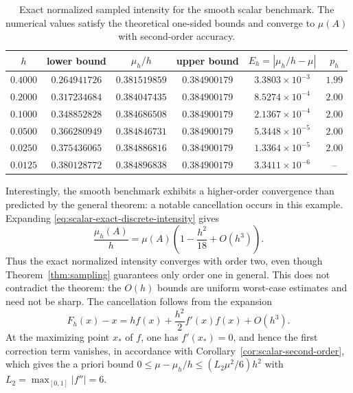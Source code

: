 \documentclass[pdflatex,sn-mathphys-num]{sn-jnl}
\numberwithin{equation}{section}
\theoremstyle{thmstyleone}%
\theoremstyle{definition}
\theoremstyle{remark}
\begin{document}
\begin{table}[t]
    \centering
    \caption{Exact normalized sampled intensity for the smooth scalar benchmark. The numerical values satisfy the theoretical one-sided bounds and converge to $\mu(A)$ with second-order accuracy.}
    \label{tab:scalar-bounds}
    \begin{tabular}{cccccc}
        \toprule
        \(h\)
        &
        lower bound
        &
        \(\mu_h/h\)
        &
        upper bound
        &
        \(E_h=|\mu_h/h-\mu|\)
        &
        \(p_h\)
        \\
        \midrule
        \(0.4000\) & \(0.264941726\) & \(0.381519859\)
                   & \(0.384900179\) & \(3.3803\times10^{-3}\) & \(1.99\)\\
        \(0.2000\) & \(0.317234684\) & \(0.384047435\)
                   & \(0.384900179\) & \(8.5274\times10^{-4}\) & \(2.00\)\\
        \(0.1000\) & \(0.348852828\) & \(0.384686508\)
                   & \(0.384900179\) & \(2.1367\times10^{-4}\) & \(2.00\)\\
        \(0.0500\) & \(0.366280949\) & \(0.384846731\)
                   & \(0.384900179\) & \(5.3448\times10^{-5}\) & \(2.00\)\\
        \(0.0250\) & \(0.375436065\) & \(0.384886816\)
                   & \(0.384900179\) & \(1.3364\times10^{-5}\) & \(2.00\)\\
        \(0.0125\) & \(0.380128772\) & \(0.384896838\)
                   & \(0.384900179\) & \(3.3411\times10^{-6}\) & --\\
        \bottomrule
    \end{tabular}
\end{table}

Interestingly, the smooth benchmark exhibits a higher-order convergence than predicted by the general theorem: a notable cancellation occurs in this example.  Expanding \eqref{eq:scalar-exact-discrete-intensity} gives
\begin{equation}
    \frac{\mu_h(A)}h
    =
    \mu(A)
    \left(
        1-\frac{h^2}{18}+O(h^3)
    \right).
    \label{eq:scalar-second-order-expansion}
\end{equation}
Thus the exact normalized intensity converges with order two, even though Theorem~\ref{thm:sampling} guarantees only order one in general. This does not contradict the theorem: the \(O(h)\) bounds are uniform
worst-case estimates and need not be sharp. The cancellation follows from the expansion
\[
F_h(x)-x
=
hf(x)+\frac{h^2}{2}f'(x)f(x)+O(h^3).
\]
At the maximizing point $x_*$ of $f$, one has $f'(x_*)=0$, and hence the first correction term vanishes, in accordance with Corollary~\ref{cor:scalar-second-order}, which gives the a priori bound \(0\leq\mu-\mu_h/h\leq(L_2\mu^2/6)h^2\) with \(L_2=\max_{[0,1]}|f''|=6\).
\end{document}
